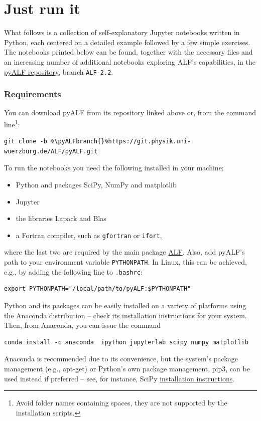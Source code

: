 \documentclass[10pt,modern]{scrartcl}
\numberwithin{exerciseitem}{exercise} %
\newcommand{\ALFbranch}{ALF-2.2}   %
\newcommand{\pyALFbranch}{ALF-2.2} %
\begin{document}
\part{Just run it}

What follows is a collection of self-explanatory Jupyter notebooks written in Python, each centered on a detailed example followed by a few simple exercises. The notebooks printed below can be found, together with the necessary files and an increasing number of additional notebooks exploring ALF's capabilities, in the \href{https://git.physik.uni-wuerzburg.de/ALF/pyALF/-/tree/\pyALFbranch}{pyALF repository}, branch \texttt{\pyALFbranch{}}.


\section*{Requirements}

You can download pyALF from its repository linked above or, from the command line\footnote{Avoid folder names containing spaces, they are not supported by the installation scripts.}:
\begin{lstlisting}[style=bash,escapechar=\%]
git clone -b %\pyALFbranch{}%https://git.physik.uni-wuerzburg.de/ALF/pyALF.git
\end{lstlisting}
To run the notebooks you need the following installed in your machine:
\begin{itemize}
	\item Python and packages SciPy, NumPy and matplotlib
	\item Jupyter
	\item the libraries Lapack and Blas
	\item a Fortran compiler, such as \texttt{gfortran} or \texttt{ifort},
\end{itemize}
where the last two are required by the main package \href{https://git.physik.uni-wuerzburg.de/ALF/ALF/-/tree/\ALFbranch}{ALF}. %
Also, add pyALF's path to your environment variable \texttt{PYTHONPATH}. In Linux, this can be achieved, e.g., by adding the following line to \texttt{.bashrc}:
\begin{lstlisting}[style=bash]
export PYTHONPATH="/local/path/to/pyALF:$PYTHONPATH"
\end{lstlisting}

Python and its packages can be easily installed on a variety of platforms using the Anaconda distribution -- check its \href{https://docs.anaconda.com/anaconda/install/}{installation instructions} for your system. Then, from Anaconda, you can issue the command
\begin{lstlisting}[style=bash]
conda install -c anaconda  ipython jupyterlab scipy numpy matplotlib
\end{lstlisting}
Anaconda is recommended due to its convenience, but the system's package management (e.g., apt-get) or Python's own package management, pip3, can be used instead if preferred -- see, for instance, SciPy \href{https://www.scipy.org/install.html}{installation instructions}.
\end{document}
